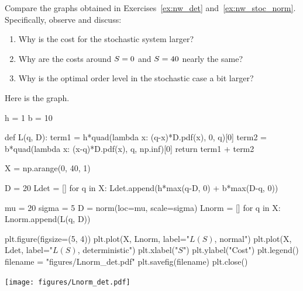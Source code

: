 \begin{exercise}[Continuation]
Compare  the graphs obtained in Exercises~\ref{ex:nw_det} and~\ref{ex:nw_stoc_norm}. 
Specifically, observe and discuss:
\begin{enumerate}
\item Why is the  cost for the stochastic system larger?
\item Why are the costs around $S=0$ and $S=40$ nearly the same? 
\item Why is the optimal order level in the stochastic case a bit larger?
\end{enumerate}
\begin{solution}
Here is the graph.

\begin{pycode}[news]
h = 1
b = 10

def L(q, D):
    term1 = h*quad(lambda x: (q-x)*D.pdf(x), 0, q)[0]
    term2 = b*quad(lambda x: (x-q)*D.pdf(x), q, np.inf)[0]
    return term1 + term2

X = np.arange(0, 40, 1)

D = 20
Ldet = []
for q in X:
    Ldet.append(h*max(q-D, 0) + b*max(D-q, 0))

mu = 20
sigma = 5 
D = norm(loc=mu, scale=sigma) 
Lnorm = []
for q in X:
    Lnorm.append(L(q, D))

plt.figure(figsize=(5, 4))
plt.plot(X, Lnorm, label="$L(S)$, normal")
plt.plot(X, Ldet, label="$L(S)$, deterministic")
plt.xlabel("$S$")
plt.ylabel("Cost")
plt.legend()
filename = "figures/Lnorm_det.pdf"
plt.savefig(filename)
plt.close()
\end{pycode}

\begin{center}
\texttt{[image: figures/Lnorm\_det.pdf]}
\end{center}


\end{solution}
\end{exercise}
